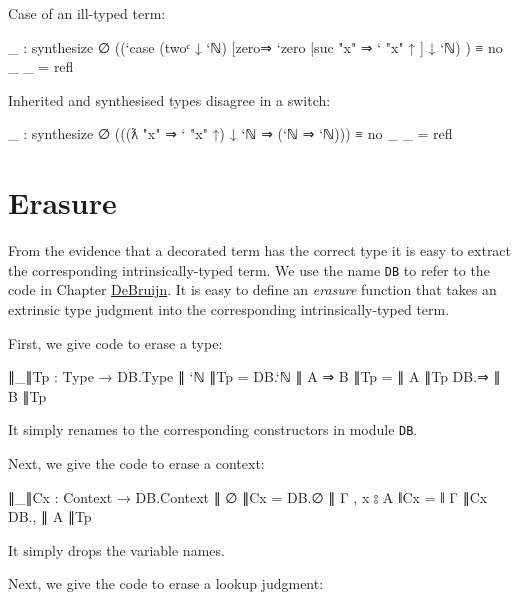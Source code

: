 Case of an ill-typed term:

\begin{fence}
\begin{code}
_ : synthesize ∅
      ((`case (twoᶜ ↓ `ℕ) [zero⇒ `zero |suc "x" ⇒ ` "x" ↑ ] ↓ `ℕ) ) ≡ no _
_ = refl
\end{code}
\end{fence}

Inherited and synthesised types disagree in a switch:

\begin{fence}
\begin{code}
_ : synthesize ∅ (((ƛ "x" ⇒ ` "x" ↑) ↓ `ℕ ⇒ (`ℕ ⇒ `ℕ))) ≡ no _
_ = refl
\end{code}
\end{fence}

\hypertarget{erasure}{%
\section{Erasure}\label{erasure}}

From the evidence that a decorated term has the correct type it is easy
to extract the corresponding intrinsically-typed term. We use the name
\texttt{DB} to refer to the code in Chapter
\protect\hyperlink{DeBruijn}{DeBruijn}. It is easy to define an
\emph{erasure} function that takes an extrinsic type judgment into the
corresponding intrinsically-typed term.

First, we give code to erase a type:

\begin{fence}
\begin{code}
∥_∥Tp : Type → DB.Type
∥ `ℕ ∥Tp             =  DB.`ℕ
∥ A ⇒ B ∥Tp          =  ∥ A ∥Tp DB.⇒ ∥ B ∥Tp
\end{code}
\end{fence}

It simply renames to the corresponding constructors in module
\texttt{DB}.

Next, we give the code to erase a context:

\begin{fence}
\begin{code}
∥_∥Cx : Context → DB.Context
∥ ∅ ∥Cx              =  DB.∅
∥ Γ , x ⦂ A ∥Cx      =  ∥ Γ ∥Cx DB., ∥ A ∥Tp
\end{code}
\end{fence}

It simply drops the variable names.

Next, we give the code to erase a lookup judgment:

